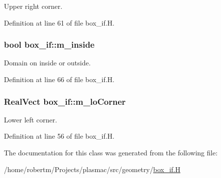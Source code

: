 Upper right corner. 



Definition at line 61 of file box\+\_\+if.\+H.

\subsubsection[{\texorpdfstring{m\+\_\+inside}{m_inside}}]{\setlength{\rightskip}{0pt plus 5cm}bool box\+\_\+if\+::m\+\_\+inside\hspace{0.3cm}{\ttfamily [protected]}}\hypertarget{classbox__if_a92b4241e4c315e99505720c5aa4cba9a}{}\label{classbox__if_a92b4241e4c315e99505720c5aa4cba9a}


Domain on inside or outside. 



Definition at line 66 of file box\+\_\+if.\+H.

\subsubsection[{\texorpdfstring{m\+\_\+lo\+Corner}{m_loCorner}}]{\setlength{\rightskip}{0pt plus 5cm}Real\+Vect box\+\_\+if\+::m\+\_\+lo\+Corner\hspace{0.3cm}{\ttfamily [protected]}}\hypertarget{classbox__if_aeb61bce3522cf63e7a7e20e1830e9462}{}\label{classbox__if_aeb61bce3522cf63e7a7e20e1830e9462}


Lower left corner. 



Definition at line 56 of file box\+\_\+if.\+H.



The documentation for this class was generated from the following file\+:\begin{DoxyCompactItemize}
\item 
/home/robertm/\+Projects/plasmac/src/geometry/\hyperlink{box__if_8H}{box\+\_\+if.\+H}\end{DoxyCompactItemize}
